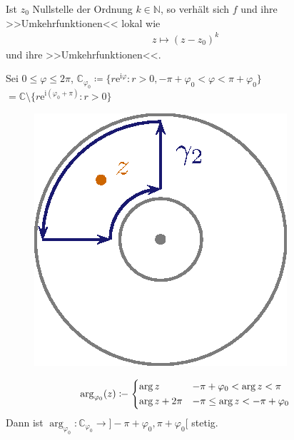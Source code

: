 \documentclass[a4paper,10pt]{scrbook}
\begin{document}
\begin{notice*}[Ziel:]
  Ist $z_0$ Nullstelle der Ordnung $k \in \mathbb{N}$, so verhält sich $f$ und ihre >>Umkehrfunktionen<< lokal wie
  \begin{align*}
    z \mapsto (z-z_0)^k
  \end{align*}
  und ihre >>Umkehrfunktionen<<.
\end{notice*}

\begin{theorem}[Hilfssatz]
  Sei $0 \leq \varphi \leq 2 \pi$, $\mathbb{C}_{\varphi_0} \coloneq \{ r \mathrm{e}^{\mathrm{i} \varphi} : r > 0, -\pi + \varphi_0 < \varphi < \pi + \varphi_0 \}$ $=\mathbb{C} \setminus \{ r \mathrm{e}^{\mathrm{i} (\varphi_0 + \pi)} : r > 0 \}$

  \begin{figure}[H]
    \centering
    \includegraphics[scale=0.2]{images/ana3-tmp-24}
    \vspace*{-4em}
  \end{figure}

  \begin{align*}
    \arg_{\varphi_0} (z) \coloneq
    \begin{dcases}
      \arg z & -\pi + \varphi_0 < \arg z < \pi \\
      \arg z + 2 \pi & -\pi \leq \arg z < -\pi + \varphi_0
    \end{dcases}
  \end{align*}
  Dann ist $\arg_{\varphi_0} : \mathbb{C}_{\varphi_0} \to ]-\pi+\varphi_0 , \pi+\varphi_0[$ stetig.


\end{theorem}
\end{document}
